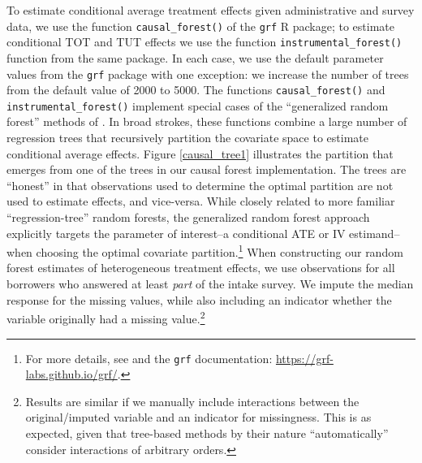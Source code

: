 \documentclass[oneside,11pt]{article}
\begin{document}
To estimate conditional average treatment effects given administrative and survey data, we use the function \texttt{causal\_forest()} of the \texttt{grf} R package; to estimate conditional TOT and TUT effects we use the function \texttt{instrumental\_forest()} function from the same package.
In each case, we use the default parameter values from the \texttt{grf} package with one exception: we increase the number of trees from the default value of 2000 to 5000.
The functions \texttt{causal\_forest()} and \texttt{instrumental\_forest()} implement special cases of the ``generalized random forest'' methods of \cite{atheygrf}.
In broad strokes, these functions combine a large number of regression trees that recursively partition the covariate space to estimate conditional average effects.
Figure \ref{causal_tree1} illustrates the partition that emerges from one of the trees in our causal forest implementation.
The trees are ``honest'' in that observations used to determine the optimal partition are not used to estimate effects, and vice-versa.
While closely related to more familiar ``regression-tree'' random forests, the generalized random forest approach explicitly targets the parameter of interest--a conditional ATE or IV estimand--when choosing the optimal covariate partition.\footnote{For more details, see \cite{atheygrf} and the \texttt{grf} documentation: \url{https://grf-labs.github.io/grf/}.} 
When constructing our random forest estimates of heterogeneous treatment effects, we use observations for all borrowers who answered at least \emph{part} of the intake survey.
We impute the median response for the missing values, while also including an indicator whether the variable originally had a missing value.\footnote{Results are similar if we manually include interactions between the original/imputed variable and an indicator for missingness. This is as expected, given that tree-based methods by their nature ``automatically'' consider interactions of arbitrary orders.}
\end{document}
